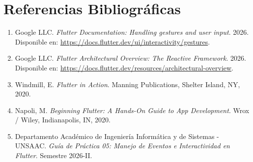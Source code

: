\documentclass[12pt,a4paper]{article}
\begin{document}
  \section{Referencias Bibliográficas}

  \begin{enumerate}[leftmargin=*]
      \item Google LLC. \textit{Flutter Documentation: Handling gestures and user input}. 2026. Disponible en: \url{https://docs.flutter.dev/ui/interactivity/gestures}.
      \item Google LLC. \textit{Flutter Architectural Overview: The Reactive Framework}. 2026. Disponible en: \url{https://docs.flutter.dev/resources/architectural-overview}.
      \item Windmill, E. \textit{Flutter in Action}. Manning Publications, Shelter Island, NY, 2020.
      \item Napoli, M. \textit{Beginning Flutter: A Hands-On Guide to App Development}. Wrox / Wiley, Indianapolis, IN, 2020.
      \item Departamento Académico de Ingeniería Informática y de Sistemas - UNSAAC. \textit{Guía de Práctica 05: Manejo de Eventos e Interactividad en Flutter}. Semestre 2026-II.
  \end{enumerate}
\end{document}
